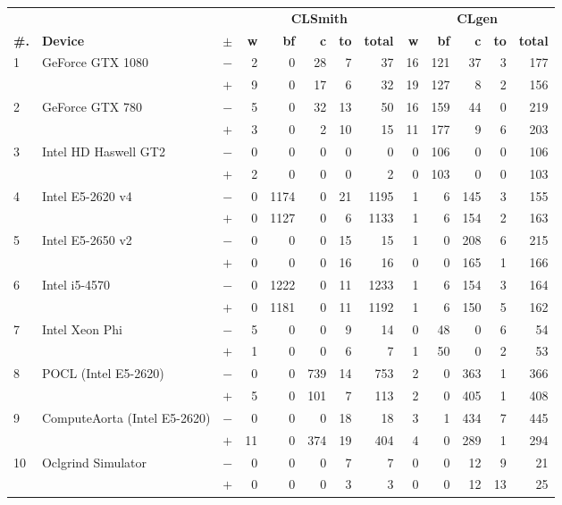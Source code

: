   \begin{tabular}{lll | rrrrr | rrrrr }
  \toprule
  & & & \multicolumn{5}{c|}{\textbf{CLSmith}} & \multicolumn{5}{c}{\textbf{CLgen}} \\
  \textbf{\#.} & \textbf{Device} & $\pm$ &
  \textbf{w} & \textbf{bf} & \textbf{c} & \textbf{to} & \textbf{total} &
  \textbf{w} & \textbf{bf} & \textbf{c} & \textbf{to} & \textbf{total} \\
  \midrule
  \multirow{ 2}{*}{1} & \multirow{ 2}{*}{GeForce GTX 1080} & $-$ & 2 & 0 & 28 & 7 & 37       & 16 & 121 & 37 & 3 & 177 \\& & $+$ & 9 & 0 & 17 & 6 & 32 & 19 & 127 & 8 & 2 & 156 \\
\hline
\multirow{ 2}{*}{2} & \multirow{ 2}{*}{GeForce GTX 780} & $-$ & 5 & 0 & 32 & 13 & 50       & 16 & 159 & 44 & 0 & 219 \\& & $+$ & 3 & 0 & 2 & 10 & 15 & 11 & 177 & 9 & 6 & 203 \\
\hline
\multirow{ 2}{*}{3} & \multirow{ 2}{*}{Intel HD Haswell GT2} & $-$ & 0 & 0 & 0 & 0 & 0       & 0 & 106 & 0 & 0 & 106 \\& & $+$ & 2 & 0 & 0 & 0 & 2 & 0 & 103 & 0 & 0 & 103 \\
\hline
\multirow{ 2}{*}{4} & \multirow{ 2}{*}{Intel E5-2620 v4} & $-$ & 0 & 1174 & 0 & 21 & 1195       & 1 & 6 & 145 & 3 & 155 \\& & $+$ & 0 & 1127 & 0 & 6 & 1133 & 1 & 6 & 154 & 2 & 163 \\
\hline
\multirow{ 2}{*}{5} & \multirow{ 2}{*}{Intel E5-2650 v2} & $-$ & 0 & 0 & 0 & 15 & 15       & 1 & 0 & 208 & 6 & 215 \\& & $+$ & 0 & 0 & 0 & 16 & 16 & 0 & 0 & 165 & 1 & 166 \\
\hline
\multirow{ 2}{*}{6} & \multirow{ 2}{*}{Intel i5-4570} & $-$ & 0 & 1222 & 0 & 11 & 1233       & 1 & 6 & 154 & 3 & 164 \\& & $+$ & 0 & 1181 & 0 & 11 & 1192 & 1 & 6 & 150 & 5 & 162 \\
\hline
\multirow{ 2}{*}{7} & \multirow{ 2}{*}{Intel Xeon Phi} & $-$ & 5 & 0 & 0 & 9 & 14       & 0 & 48 & 0 & 6 & 54 \\& & $+$ & 1 & 0 & 0 & 6 & 7 & 1 & 50 & 0 & 2 & 53 \\
\hline
\multirow{ 2}{*}{8} & \multirow{ 2}{*}{POCL (Intel E5-2620)} & $-$ & 0 & 0 & 739 & 14 & 753       & 2 & 0 & 363 & 1 & 366 \\& & $+$ & 5 & 0 & 101 & 7 & 113 & 2 & 0 & 405 & 1 & 408 \\
\hline
\multirow{ 2}{*}{9} & \multirow{ 2}{*}{ComputeAorta (Intel E5-2620)} & $-$ & 0 & 0 & 0 & 18 & 18       & 3 & 1 & 434 & 7 & 445 \\& & $+$ & 11 & 0 & 374 & 19 & 404 & 4 & 0 & 289 & 1 & 294 \\
\hline
\multirow{ 2}{*}{10} & \multirow{ 2}{*}{Oclgrind Simulator} & $-$ & 0 & 0 & 0 & 7 & 7       & 0 & 0 & 12 & 9 & 21 \\& & $+$ & 0 & 0 & 0 & 3 & 3 & 0 & 0 & 12 & 13 & 25 \\
  \bottomrule
\end{tabular}

